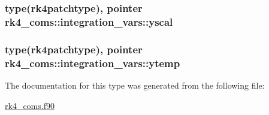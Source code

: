 \subsubsection[{\texorpdfstring{yscal}{yscal}}]{\setlength{\rightskip}{0pt plus 5cm}type({\bf rk4patchtype}), pointer rk4\+\_\+coms\+::integration\+\_\+vars\+::yscal}\hypertarget{structrk4__coms_1_1integration__vars_ae6e62e452c7a2d6f61027f59c8de3b8c}{}\label{structrk4__coms_1_1integration__vars_ae6e62e452c7a2d6f61027f59c8de3b8c}
\subsubsection[{\texorpdfstring{ytemp}{ytemp}}]{\setlength{\rightskip}{0pt plus 5cm}type({\bf rk4patchtype}), pointer rk4\+\_\+coms\+::integration\+\_\+vars\+::ytemp}\hypertarget{structrk4__coms_1_1integration__vars_a65e3efd63a1824510230efa994043c65}{}\label{structrk4__coms_1_1integration__vars_a65e3efd63a1824510230efa994043c65}


The documentation for this type was generated from the following file\+:\begin{DoxyCompactItemize}
\item 
\hyperlink{rk4__coms_8f90}{rk4\+\_\+coms.\+f90}\end{DoxyCompactItemize}
